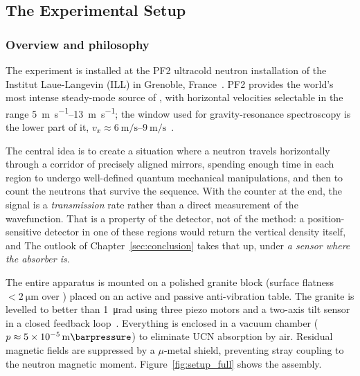 \documentclass[a4paper,headsepline,oneside,11pt]{scrartcl}
\begin{document}
\subsection{The Experimental Setup}
\label{sec:setup}   %

\subsubsection{Overview and philosophy}
\label{sec:setup_overview}

The \qbounce{} experiment is installed at the PF2 ultracold neutron
installation of the Institut Laue-Langevin (ILL) in Grenoble,
France~\cite{Jenke2011, Bosina2023, Micko2023}.
PF2 provides the world's most intense steady-mode source of \UCNs{},
with horizontal velocities selectable in the range \SIrange{5}{13}{\metre\per\second}; the
window used for gravity-resonance spectroscopy is the lower part of it,
$v_x \approx \SIrange{6}{9}{\metre\per\second}$~\cite{Bosina2023}.

The central idea is to create a situation where a neutron travels
horizontally through a corridor of precisely aligned mirrors, spending
enough time in each region to undergo well-defined quantum mechanical
manipulations, and then to count the neutrons that survive the
sequence.
With the counter at the end, the signal is a \emph{transmission} rate rather
than a direct measurement of the wavefunction. That is a property of the
detector, not of the method: a position-sensitive detector in one of these
regions would return the vertical density itself, and
The outlook of Chapter~\ref{sec:conclusion} takes that up, under \emph{a sensor
where the absorber is}.

The entire apparatus is mounted on a polished granite block
(surface flatness $< \SI{2}{\micro\metre}$ over )
placed on an active and passive anti-vibration table.
The granite is levelled to better than \SI{1}{\micro\radian} using
three piezo motors and a two-axis tilt sensor in a closed feedback
loop~\cite{Bosina2023}.
Everything is enclosed in a vacuum chamber ($p \approx \SI{5e-5}{\milli\barpressure}$) to eliminate UCN absorption by air.
Residual magnetic fields are suppressed by a $\mu$-metal shield,
preventing stray coupling to the neutron magnetic moment.
Figure~\ref{fig:setup_full} shows the assembly.
\end{document}
